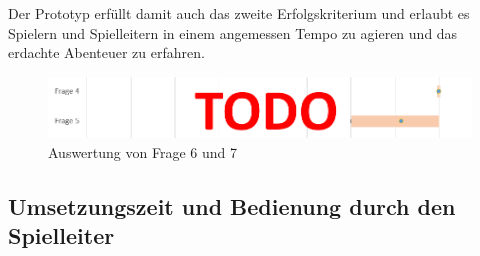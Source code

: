 Der Prototyp erfüllt damit auch das zweite Erfolgskriterium und erlaubt es Spielern und Spielleitern in einem angemessen Tempo zu agieren und das erdachte Abenteuer zu erfahren.

\begin{figure}
	\centering
		\includegraphics[width=1.00\textwidth]{media/2questions_temp.png}
	\caption{Auswertung von Frage 6 und 7}
	\label{fig:questions_6_7}
\end{figure}


\subsection{Umsetzungszeit und Bedienung durch den Spielleiter}
\label{sec:UmsetzungszeitUndBedienungDurchDenSpielleiter}

